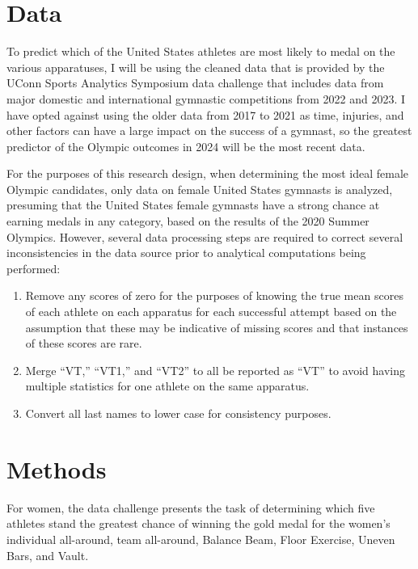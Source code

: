 \documentclass[12pt]{article}
\begin{document}
\section{Data}
\label{sec:data}

To predict which of the United States athletes are most likely to medal on the various apparatuses, 
I will be using the cleaned data that is provided by the UConn Sports Analytics Symposium data challenge 
that includes data from major domestic and international gymnastic competitions from 2022 and 2023. 
I have opted against using the older data from 2017 to 2021 as time, injuries, 
and other factors can have a large impact on the success of a gymnast, so the greatest predictor
of the Olympic outcomes in 2024 will be the most recent data.


For the purposes of this research design, when determining the most ideal female Olympic candidates, 
only data on female United States gymnasts is analyzed, presuming that the United States 
female gymnasts have a strong chance at earning medals in any category, based on the results of the 2020 Summer Olympics. 
However, several data processing steps are required to correct several inconsistencies in the data source prior to 
analytical computations being performed:

\begin{enumerate}
\item Remove any scores of zero for the purposes of knowing the true mean scores of each athlete on each 
apparatus for each successful attempt based on the assumption that these may 
be indicative of missing scores and that instances of these scores are rare.
\item Merge ``VT,'' ``VT1,'' and ``VT2'' to all be reported as ``VT'' to avoid having 
multiple statistics for one athlete on the same apparatus.
\item Convert all last names to lower case for consistency purposes.
\end{enumerate}


\section{Methods}
\label{sec:meth}

For women, the data challenge presents the task of determining 
which five athletes stand the greatest chance of winning the gold medal for the women's individual all-around,
team all-around, Balance Beam, Floor Exercise, Uneven Bars, and Vault. 
\end{document}
